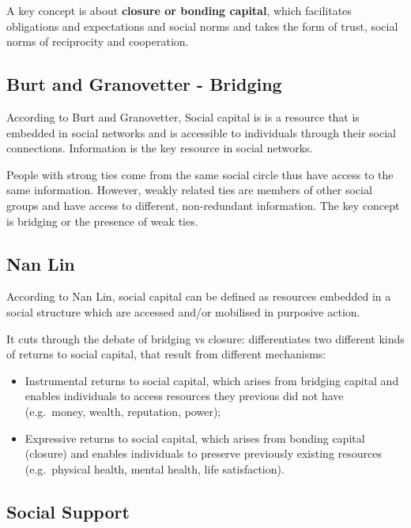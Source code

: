 \documentclass[
  notitlepage,
  onecolumn,
  openany]{book}
\providecommand{\tightlist}{%
  \setlength{\itemsep}{0pt}\setlength{\parskip}{0pt}}
\begin{document}
A key concept is about \textbf{closure or bonding capital}, which facilitates obligations and expectations and social norms and takes the form of trust, social norms of reciprocity and cooperation.

\hypertarget{burt-and-granovetter---bridging}{%
\subsection{Burt and Granovetter - Bridging}\label{burt-and-granovetter---bridging}}

According to Burt and Granovetter, Social capital is is a resource that is embedded in social networks and is accessible to individuals through their social connections. Information is the key resource in social networks.

People with strong ties come from the same social circle thus have access to the same information. However, weakly related ties are members of other social groups and have access to different, non-redundant information. The key concept is bridging or the presence of weak ties.

\hypertarget{nan-lin}{%
\subsection{Nan Lin}\label{nan-lin}}

According to Nan Lin, social capital can be defined as resources embedded in a social structure which are accessed and/or mobilised in purposive action.

It cuts through the debate of bridging vs closure: differentiates two different kinds of returns to social capital, that result from different mechanisms:

\begin{itemize}
\tightlist
\item
  Instrumental returns to social capital, which arises from bridging capital and enables individuals to access resources they previous did not have (e.g.~money, wealth, reputation, power);
\item
  Expressive returns to social capital, which arises from bonding capital (closure) and enables individuals to preserve previously existing resources (e.g.~physical health, mental health, life satisfaction).
\end{itemize}

\hypertarget{social-support}{%
\subsection{Social Support}\label{social-support}}
\end{document}
